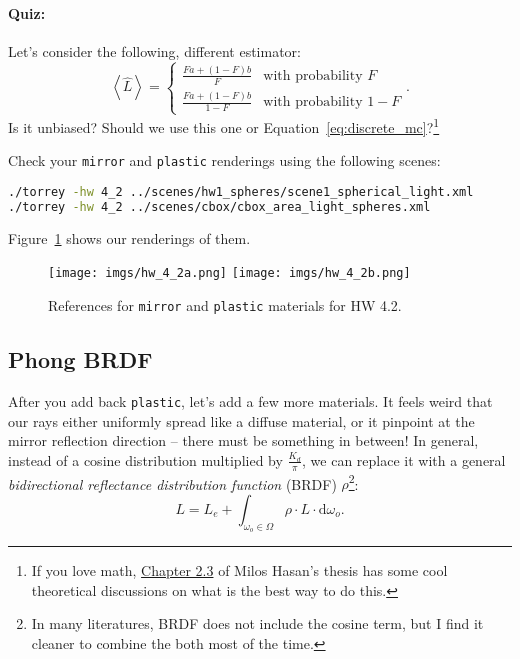 \paragraph{Quiz:} Let's consider the following, different estimator:
\begin{equation}
\left<\hat{L}\right> = \begin{cases}
\frac{F a + (1 - F)b}{F} & \text{with probability } F \\
\frac{F a + (1 - F)b}{1 - F} & \text{with probability } 1 - F
\end{cases}.
\end{equation}
Is it unbiased? Should we use this one or Equation~\eqref{eq:discrete_mc}?\footnote{If you love math, \href{https://ecommons.cornell.edu/handle/1813/13985}{Chapter 2.3} of Milos Hasan's thesis has some cool theoretical discussions on what is the best way to do this.}

Check your \lstinline{mirror} and \lstinline{plastic} renderings using the following scenes:
\begin{lstlisting}[language=bash]
./torrey -hw 4_2 ../scenes/hw1_spheres/scene1_spherical_light.xml
./torrey -hw 4_2 ../scenes/cbox/cbox_area_light_spheres.xml
\end{lstlisting}
Figure~\ref{fig:hw_4_2_mirror_plastic} shows our renderings of them.

\begin{figure}[ht]
    \centering
    \texttt{[image: imgs/hw\_4\_2a.png]}
    \texttt{[image: imgs/hw\_4\_2b.png]}
    \caption{References for \lstinline{mirror} and \lstinline{plastic} materials for HW 4.2.}
    \label{fig:hw_4_2_mirror_plastic}
\end{figure}

\subsection{Phong BRDF}
After you add back \lstinline{plastic}, let's add a few more materials. It feels weird that our rays either uniformly spread like a diffuse material, or it pinpoint at the mirror reflection direction -- there must be something in between! In general, instead of a cosine distribution multiplied by $\frac{K_d}{\pi}$, we can replace it with a general \emph{bidirectional reflectance distribution function} (BRDF) $\rho$\footnote{In many literatures, BRDF does not include the cosine term, but I find it cleaner to combine the both most of the time.}:
\begin{equation}
L = L_e + \int_{\omega_o \in \Omega} \rho \cdot L \cdot \mathrm{d}\omega_o.
\label{eq:rendering_equation}
\end{equation}


